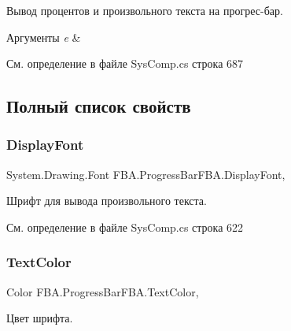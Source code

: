 Вывод процентов и произвольного текста на прогрес-\/бар. 


\begin{DoxyParams}{Аргументы}
{\em e} & \\
\hline
\end{DoxyParams}


См. определение в файле Sys\+Comp.\+cs строка 687



\subsection{Полный список свойств}
\mbox{\label{class_f_b_a_1_1_progress_bar_f_b_a_adebd70575557c2b3f32473af012a477e}} 
\subsubsection{\texorpdfstring{Display\+Font}{DisplayFont}}
{\footnotesize\ttfamily System.\+Drawing.\+Font F\+B\+A.\+Progress\+Bar\+F\+B\+A.\+Display\+Font\hspace{0.3cm}{\ttfamily [get]}, {\ttfamily [set]}}



Шрифт для вывода произвольного текста. 



См. определение в файле Sys\+Comp.\+cs строка 622

\mbox{\label{class_f_b_a_1_1_progress_bar_f_b_a_a855ba1a8b8a6bd80cd4ac2ba69926f15}} 
\subsubsection{\texorpdfstring{Text\+Color}{TextColor}}
{\footnotesize\ttfamily Color F\+B\+A.\+Progress\+Bar\+F\+B\+A.\+Text\+Color\hspace{0.3cm}{\ttfamily [get]}, {\ttfamily [set]}}



Цвет шрифта. 



